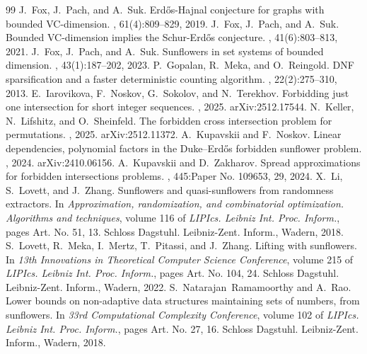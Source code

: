 \documentclass[10pt,a4paper]{amsart}
\begin{document}
\begin{thebibliography}{99}
 J.~Fox, J.~Pach, and A.~Suk. \newblock Erd{\H{o}}s-{H}ajnal conjecture for graphs with bounded {VC}-dimension. , 61(4):809--829, 2019.
 J.~Fox, J.~Pach, and A.~Suk. \newblock Bounded {VC}-dimension implies the {S}chur-{E}rd{\H{o}}s conjecture. , 41(6):803--813, 2021.
 J.~Fox, J.~Pach, and A.~Suk. \newblock Sunflowers in set systems of bounded dimension. , 43(1):187--202, 2023.
 P.~Gopalan, R.~Meka, and O.~Reingold. \newblock D{NF} sparsification and a faster deterministic counting algorithm. , 22(2):275--310, 2013.
 E.~Iarovikova, F.~Noskov, G.~Sokolov, and N.~Terekhov. \newblock Forbidding just one intersection for short integer sequences. , 2025. \newblock arXiv:2512.17544.
 N.~Keller, N.~Lifshitz, and O.~Sheinfeld. \newblock The forbidden cross intersection problem for permutations. , 2025. \newblock arXiv:2512.11372.
 A.~Kupavskii and F.~Noskov. \newblock Linear dependencies, polynomial factors in the {Duke--Erd{\H{o}}s} forbidden sunflower problem. , 2024. \newblock arXiv:2410.06156.
 A.~Kupavskii and D.~Zakharov. \newblock Spread approximations for forbidden intersections problems. , 445:Paper No. 109653, 29, 2024.
 X.~Li, S.~Lovett, and J.~Zhang. \newblock Sunflowers and quasi-sunflowers from randomness extractors. \newblock In {\em Approximation, randomization, and combinatorial optimization. {A}lgorithms and techniques}, volume 116 of {\em LIPIcs. Leibniz Int. Proc. Inform.}, pages Art. No. 51, 13. Schloss Dagstuhl. Leibniz-Zent. Inform., Wadern, 2018.
 S.~Lovett, R.~Meka, I.~Mertz, T.~Pitassi, and J.~Zhang. \newblock Lifting with sunflowers. \newblock In {\em 13th {I}nnovations in {T}heoretical {C}omputer {S}cience {C}onference}, volume 215 of {\em LIPIcs. Leibniz Int. Proc. Inform.}, pages Art. No. 104, 24. Schloss Dagstuhl. Leibniz-Zent. Inform., Wadern, 2022.
 S.~Natarajan~Ramamoorthy and A.~Rao. \newblock Lower bounds on non-adaptive data structures maintaining sets of numbers, from sunflowers. \newblock In {\em 33rd {C}omputational {C}omplexity {C}onference}, volume 102 of {\em LIPIcs. Leibniz Int. Proc. Inform.}, pages Art. No. 27, 16. Schloss Dagstuhl. Leibniz-Zent. Inform., Wadern, 2018.

\end{thebibliography}
\end{document}
